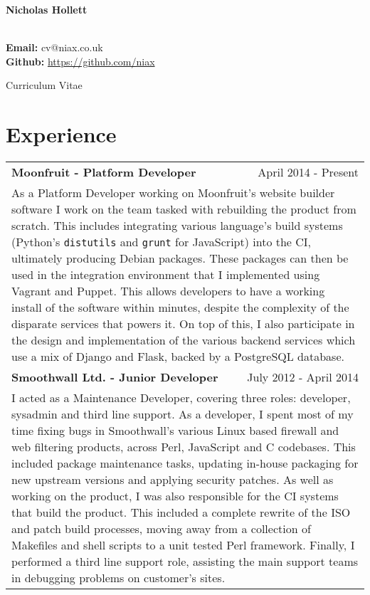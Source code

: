\documentclass[11pt]{report}
\begin{document}
\pagestyle{empty}
\begin{center}
\begin{LARGE}
{\bf Nicholas Hollett}
\end{LARGE}\\
{\bf Email:} {\ttfamily cv@niax.co.uk} \\
{\bf Github:} \url{https://github.com/niax} \\[3pt]
\begin{large}
Curriculum Vitae
\end{large}
\end{center}
\section*{Experience}
\begin{tabularx}{\textwidth}{l r}
{\bf Moonfruit - Platform Developer} & April 2014 - Present \\
\multicolumn{2}{X}{
As a Platform Developer working on Moonfruit's website builder software I work on the team tasked with rebuilding the product from scratch.
This includes integrating various language's build systems (Python's {\tt distutils} and {\tt grunt} for JavaScript) into the CI, ultimately producing Debian packages.
These packages can then be used in the integration environment that I implemented using Vagrant and Puppet.
This allows developers to have a working install of the software within minutes, despite the complexity of the disparate services that powers it.
On top of this, I also participate in the design and implementation of the various backend services which use a mix of Django and Flask, backed by a PostgreSQL database.
}
\\
\addlinespace
{\bf Smoothwall Ltd. - Junior Developer} & July 2012 - April 2014 \\
\multicolumn{2}{X}{
I acted as a Maintenance Developer, covering three roles: developer, sysadmin and third line support.
As a developer, I spent most of my time fixing bugs in Smoothwall's various Linux based firewall and web filtering products,
across Perl, JavaScript and C codebases.
This included package maintenance tasks, updating in-house packaging for new upstream versions and applying security patches.
As well as working on the product, I was also responsible for the CI systems that build the product.
This included a complete rewrite of the ISO and patch build processes, moving away from a collection of Makefiles and shell scripts to a unit tested Perl framework.
Finally, I performed a third line support role, assisting the main support teams in debugging problems on customer's sites.
}
\end{tabularx}
\end{document}
